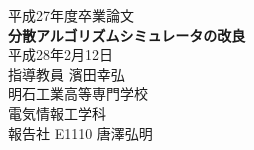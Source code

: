
\begin{titlepage}
	\centering
	\vspace*{3.5cm}
	{\huge 平成27年度卒業論文}
	\vspace{1.5cm} \\
	{\huge \textbf{分散アルゴリズムシミュレータの改良}}
	\vspace{5cm} \\
	{\LARGE 平成28年2月12日}
	\vspace{1.0cm} \\
	{\LARGE 指導教員  濱田幸弘}
	\vspace{3.5cm} \\
	{\LARGE 明石工業高等専門学校}
	\vspace{1.0cm} \\
	{\LARGE 電気情報工学科}
	\vspace{1.0cm} \\
	{\LARGE 報告社  E1110 唐澤弘明}
\end{titlepage}
